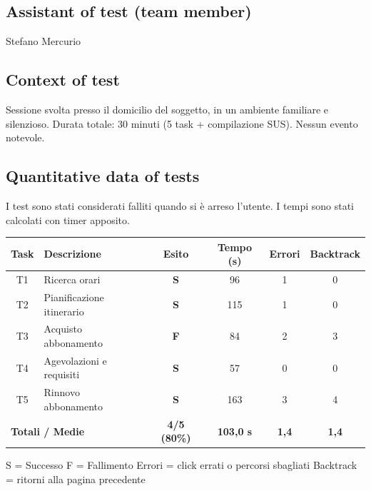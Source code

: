 ﻿\documentclass[11pt,a4paper]{article}
\begin{document}
\subsection*{Assistant of test (team member)}
\begin{tcolorbox}[base]
Stefano Mercurio
\end{tcolorbox}

\subsection*{Context of test}
\begin{tcolorbox}[base]
Sessione svolta presso il domicilio del soggetto, in un
ambiente familiare e silenzioso. Durata totale: 30 minuti
(5 task + compilazione SUS). Nessun evento notevole.
\end{tcolorbox}

\subsection*{Quantitative data of tests}
\begin{tcolorbox}[base]
I test sono stati considerati falliti quando si è arreso l'utente.
I tempi sono stati calcolati con timer apposito.
\begin{center}
\renewcommand{\arraystretch}{1.4}
\begin{tabular}{clcccc}
\toprule
\textbf{Task} & \textbf{Descrizione} &
\textbf{Esito} & \textbf{Tempo (s)} &
\textbf{Errori} & \textbf{Backtrack} \\
\midrule
T1 & Ricerca orari             & \textbf{S} & 96  & 1 & 0 \\
T2 & Pianificazione itinerario & \textbf{S} & 115 & 1 & 0 \\
T3 & Acquisto abbonamento      & \textbf{F} & 84  & 2 & 3 \\
T4 & Agevolazioni e requisiti  & \textbf{S} & 57  & 0 & 0 \\
T5 & Rinnovo abbonamento       & \textbf{S} & 163 & 3 & 4 \\
\midrule
\multicolumn{2}{l}{\textbf{Totali / Medie}} &
\textbf{4/5 (80\%)} & \textbf{103,0 s} &
\textbf{1,4} & \textbf{1,4} \\
\bottomrule
\end{tabular}
\end{center}

\vspace{0.3cm}
\small S = Successo \quad F = Fallimento \quad
Errori = click errati o percorsi sbagliati \quad
Backtrack = ritorni alla pagina precedente
\end{tcolorbox}
\end{document}

